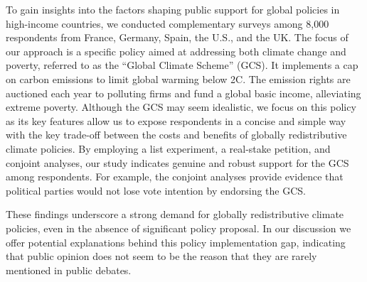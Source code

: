 \documentclass{nature}
\begin{document}
To gain insights into the factors shaping public support for global policies in high-income countries, we conducted complementary surveys among 8,000 respondents from France, Germany, Spain, the U.S., and the UK. The focus of our approach is a specific policy aimed at addressing both climate change and poverty, referred to as the ``Global Climate Scheme'' (GCS). It implements a cap on carbon emissions to limit global warming below 2\textdegree{}C. The emission rights are auctioned each year to polluting firms and fund a global basic income, alleviating extreme poverty. Although the GCS may seem idealistic, we focus on this policy as its key features allow us to expose respondents in a concise and simple way with the key trade-off between the costs and benefits of globally redistributive climate policies. %
By employing a list experiment, a real-stake petition, and conjoint analyses, our study indicates genuine and robust support for the GCS among respondents. For example, the conjoint analyses provide evidence that political parties would not lose vote intention by endorsing the GCS.%


These findings underscore a strong demand for globally redistributive climate policies, even in the absence of significant policy proposal. In our discussion we offer potential explanations behind this policy implementation gap, indicating that public opinion does not seem to be the reason that they are rarely mentioned in public debates.


\end{document}

